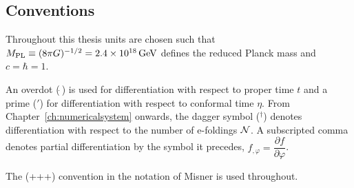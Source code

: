 \subsection*{Conventions}
\label{sec:conventions}
Throughout this thesis units are chosen such that $M_{\mathrm{PL}} \equiv (8\pi G )^{-1/2}=
2.4 \times 10^{18}\, {\rm GeV}$ defines the reduced Planck mass and $c=\hbar =1$. 

An overdot ($\dot{~}$) is used for differentiation with respect to proper
time $t$ and a prime ($'$) for differentiation with respect to conformal time
$\eta$. From Chapter~\ref{ch:numericalsystem} onwards,  the dagger symbol
($^\dagger$) denotes differentiation with respect to the
number of e-foldings $\mathcal{N}$.
% 
A subscripted comma denotes partial differentiation by the symbol it
precedes, \eg $f_{,\varphi} = \dfrac{\partial f}{\partial \varphi}$.

The (+++) convention in the notation of Misner \etal \cite{book:kip} is
used throughout. 


